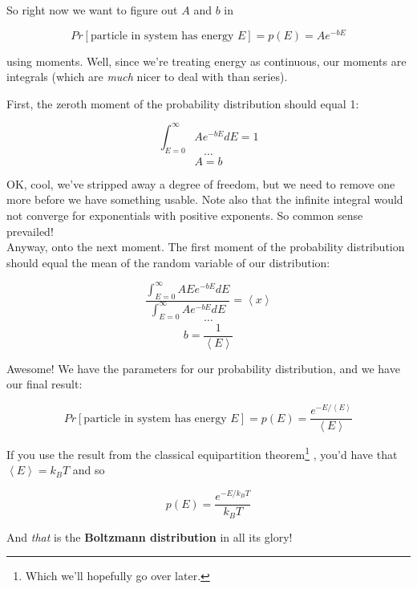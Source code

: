 \documentclass[letterpaper,12pt]{report}
\begin{document}
So right now we want to figure out \(A\) and \(b\) in

\[Pr[\text{particle in system has energy }E] = p(E) = Ae^{-bE}\]

using moments. Well, since we're treating energy as continuous, our moments
are integrals (which are \emph{much} nicer to deal with than series).

First, the zeroth moment of the probability distribution should equal 1:
 
\[\int_{E=0}^{\infty} Ae^{-bE}dE = 1 \]
\[  \cdots \]
\[  A = b \] 

OK, cool, we've stripped away a degree of freedom, but we need to remove one more
before we have something usable. Note also that the infinite integral would not converge
for exponentials with positive exponents. So common sense prevailed!
\\
Anyway, onto the next moment. The first moment of the probability distribution
should equal the mean of the random variable of our distribution:

\[\frac{\int_{E=0}^{\infty} AEe^{-bE}dE} {\int_{E=0}^{\infty} Ae^{-bE}dE} = \left<x\right> \]
\[  \cdots \]
\[  b = \frac{1}{\left<E\right>} \]

Awesome! We have the parameters for our probability distribution, and we have our final result:

\[Pr[\text{particle in system has energy }E] 
        = p(E) = \frac{e^{-E/\left<E\right>}}{\left<E\right>}
\]


If you use the result from the classical equipartition theorem\footnote{
  Which we'll hopefully go over later.
}
, you'd have that
\(\left<E\right> = k_BT\) and so 

\[p(E) = \frac{e^{-E/k_BT}}{k_BT}\]

And \emph{that} is the \textbf{Boltzmann distribution}
in all its glory!\par

\end{document}
